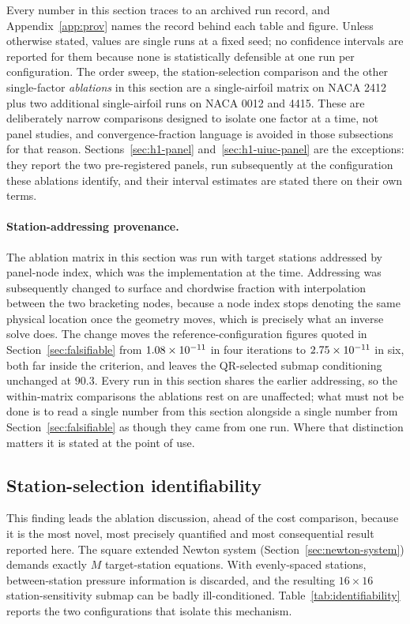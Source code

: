 Every number in this section traces to an archived run record, and
Appendix~\ref{app:prov} names the record behind each table and figure. Unless
otherwise stated, values are single runs at a fixed seed; no confidence
intervals are reported for them because none is statistically defensible at
one run per configuration. The order sweep, the station-selection comparison
and the other single-factor \emph{ablations} in this section are a
single-airfoil matrix on NACA 2412 plus two additional single-airfoil runs on
NACA 0012 and 4415. These are deliberately narrow comparisons designed to
isolate one factor at a time, not panel studies, and convergence-fraction
language is avoided in those subsections for that reason.
Sections~\ref{sec:h1-panel} and~\ref{sec:h1-uiuc-panel} are the exceptions:
they report the two pre-registered panels, run subsequently at the
configuration these ablations identify, and their interval estimates are
stated there on their own terms.

\paragraph{Station-addressing provenance.} The ablation matrix in this section
was run with target stations addressed by panel-node index, which was the
implementation at the time. Addressing was subsequently changed to surface and
chordwise fraction with interpolation between the two bracketing nodes,
because a node index stops denoting the same physical location once the
geometry moves, which is precisely what an inverse solve does. The change
moves the reference-configuration figures quoted in
Section~\ref{sec:falsifiable} from $1.08\times10^{-11}$ in four iterations to
$2.75\times10^{-11}$ in six, both far inside the criterion, and leaves the
QR-selected submap conditioning unchanged at $90.3$. Every run in this section
shares the earlier addressing, so the within-matrix comparisons the ablations
rest on are unaffected; what must not be done is to read a single number from
this section alongside a single number from Section~\ref{sec:falsifiable} as
though they came from one run. Where that distinction matters it is stated at
the point of use.

\subsection{Station-selection identifiability}
\label{sec:ablations}

This finding leads the ablation discussion, ahead of the cost comparison,
because it is the most novel, most precisely quantified and most consequential
result reported here. The square extended Newton system
(Section~\ref{sec:newton-system}) demands exactly $M$ target-station
equations. With evenly-spaced stations, between-station pressure information
is discarded, and the resulting $16\times16$ station-sensitivity submap can be
badly ill-conditioned. Table~\ref{tab:identifiability} reports the two
configurations that isolate this mechanism.

